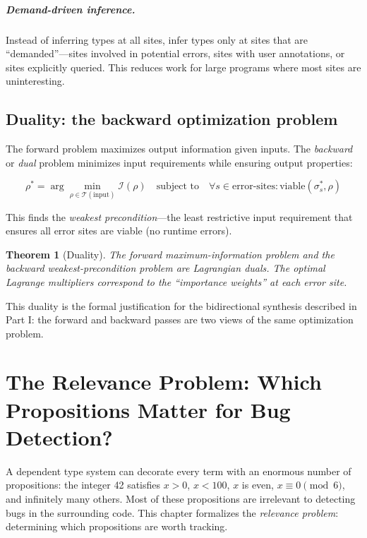 \documentclass[11pt]{report}
\theoremstyle{definition}
\theoremstyle{plain}
\newtheorem{theorem}[definition]{Theorem}
\begin{document}
\paragraph{Demand-driven inference.}
Instead of inferring types at all sites, infer types only at sites that are
``demanded''---sites involved in potential errors, sites with user
annotations, or sites explicitly queried. This reduces work for large programs
where most sites are uninteresting.

\section{Duality: the backward optimization problem}

The forward problem maximizes output information given inputs. The
\emph{backward} or \emph{dual} problem minimizes input requirements while
ensuring output properties:

\[
  \rho^* = \arg\min_{\rho \in \mathcal{T}(\text{input})}
    \mathcal{I}(\rho) \quad \text{subject to} \quad
    \forall s \in \text{error-sites}: \mathrm{viable}(\sigma^*_s, \rho)
\]

This finds the \emph{weakest precondition}---the least restrictive input
requirement that ensures all error sites are viable (no runtime errors).

\begin{theorem}[Duality]
The forward maximum-information problem and the backward
weakest-precondition problem are Lagrangian duals. The optimal Lagrange
multipliers correspond to the ``importance weights'' at each error site.
\end{theorem}

This duality is the formal justification for the bidirectional synthesis
described in Part I: the forward and backward passes are two views of the
same optimization problem.


\chapter{The Relevance Problem: Which Propositions Matter for Bug Detection?}

A dependent type system can decorate every term with an enormous number of
propositions: the integer 42 satisfies $x > 0$, $x < 100$, $x$ is even,
$x \equiv 0 \pmod{6}$, and infinitely many others. Most of these
propositions are irrelevant to detecting bugs in the surrounding code. This
chapter formalizes the \emph{relevance problem}: determining which
propositions are worth tracking.
\end{document}
